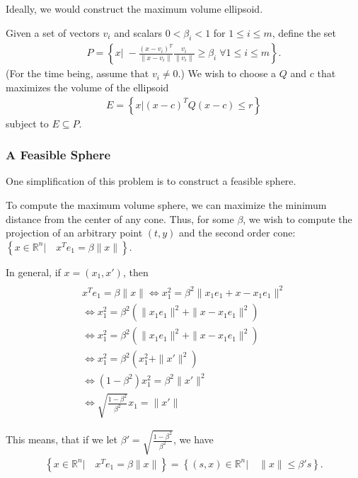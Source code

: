 \documentclass{article}
\theoremstyle{case}
\begin{document}
Ideally, we would construct the maximum volume ellipsoid.


Given a set of vectors $v_i$ and scalars $0 < \beta_i < 1$ for $1\le i\le m$, define the set
\begin{align*}
P = \left\{x\bigg|\;-\frac{(x - v_i)^T}{\|x - v_i\|} \frac{v_i}{\|v_i\|} \ge \beta_i \; \forall 1 \le i \le m\right\}.
\end{align*}
(For the time being, assume that $v_i \ne 0$.)
We wish to choose a $Q$ and $c$ that maximizes the volume of the ellipsoid
\begin{align*}
E = \left\{x | (x - c)^TQ(x - c) \le r \right\}
\end{align*}
subject to $E \subseteq P$.


\subsubsection{A Feasible Sphere}

One simplification of this problem is to construct a feasible sphere.

To compute the maximum volume sphere, we can maximize the minimum distance from the center of any cone.
Thus, for some $\beta$, we wish to compute the projection of an arbitrary point $(t, y)$ and the second order cone: $\left\{ x \in \mathbb R^n | \quad x^Te_1 = \beta \|x\| \right\}$.

In general, if $x = (x_1, x')$, then
\begin{align*}
 \\
x^Te_1 = \beta \|x\| 
 \Longleftrightarrow x_1^2 = \beta^2 \|x_1e_1  + x - x_1 e_1\|^2 \\
 \Longleftrightarrow x_1^2 = \beta^2 \left(\|x_1e_1\|^2  + \|x - x_1 e_1\|^2\right) \\
 \Longleftrightarrow x_1^2 = \beta^2 \left(\|x_1e_1\|^2  + \|x - x_1 e_1\|^2\right) \\
 \Longleftrightarrow x_1^2 = \beta^2 \left(x_1^2  + \|{x'}\|^2 \right) \\
 \Longleftrightarrow (1 - \beta^2)x_1^2 = \beta^2 \|{x'}\|^2 \\
 \Longleftrightarrow \sqrt{\frac{1 - \beta^2}{ \beta^2}} x_1 = \|{x'}\|
\end{align*}

This means, that if we let $\beta' = \sqrt{\frac{1 - \beta^2}{\beta^2}}$, we have
\begin{align*}
\left\{ x \in \mathbb R^n | \quad x^Te_1 = \beta \|x\| \right\} = \left \{(s, x)\in \mathbb R^n | \quad\|x\| \le \beta' s \right\}.
\end{align*}
\end{document}
